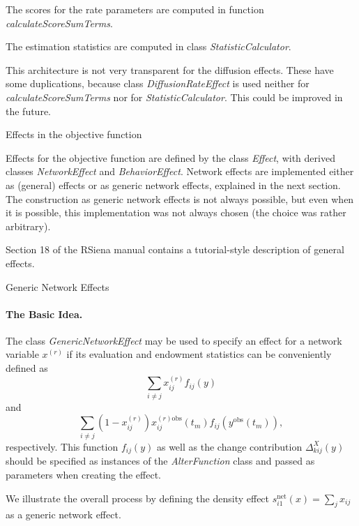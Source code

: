 \documentclass[12pt]{article}
\makeatletter
\renewcommand{\=}{\,=\,}
\newcommand{\+}{\,+\,}
\newcommand{\nnm}[1]{\textsf{\small\textit{#1}}}
\renewcommand{\subsection}{\@startsection{subsection}{2}
                {0pt}{0.7\baselineskip}{0.3\baselineskip}
                {\sffamily} }
\renewcommand{\subsubsection}{\@startsection{subsubsection}{3}
                {0pt}{0.7\baselineskip}{0.3\baselineskip}
                {\sffamily} }
\makeatother
\begin{document}
The scores for the rate parameters are computed in function \nnm{calculateScoreSumTerms}. 

The estimation statistics are computed in class \nnm{StatisticCalculator}.

This architecture is not very transparent for the diffusion effects.
These have some duplications, because class \nnm{DiffusionRateEffect}
is used neither for \nnm{calculateScoreSumTerms} nor for 
\nnm{StatisticCalculator}.
This could be improved in the future.


\subsection{Effects in the objective function}

Effects for the objective function are defined by the class
\nnm{Effect}, with derived classes \nnm{NetworkEffect} and \nnm{BehaviorEffect}.
Network effects are implemented either as (general) effects or as generic network effects, explained in the next section.
The construction as generic network effects is not always possible,
but even when it is possible, this implementation was not always chosen
(the choice was rather arbitrary).

Section 18 of the RSiena manual contains a tutorial-style description
of general effects.

\subsubsection{Generic Network Effects}

\paragraph{The Basic Idea.} The class \nnm{GenericNetworkEffect} may be used
to specify an effect for a network variable $x^{(r)}$ if its evaluation and
endowment statistics can be conveniently defined as
\[\sum_{i \neq j} x_{ij}^{(r)} f_{ij}(y)\] and
\[\sum_{i \neq j} (1-x_{ij}^{(r)}) x_{ij}^{(r)\mathrm{obs}}(t_m) f_{ij}(y^\mathrm{obs}(t_m)),\] respectively.
This function $f_{ij}(y)$ as well as the change contribution $\Delta_{kij}^X(y)$ should be specified as instances of the
\nnm{AlterFunction} class and passed as parameters when creating the effect.

We illustrate the overall process by defining the density effect $s_{i1}^\mathrm{net}(x)=\sum_j x_{ij}$
as a generic network effect.
\end{document}

